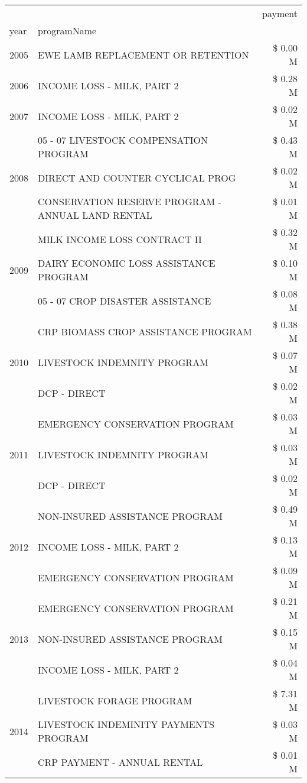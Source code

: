 \begin{tabular}{llr}
\toprule
 &  & payment \\
year & programName &  \\
\midrule
2005 & EWE LAMB REPLACEMENT OR RETENTION & \$ 0.00 M \\
\cline{1-3}
2006 & INCOME LOSS - MILK, PART 2 & \$ 0.28 M \\
\cline{1-3}
2007 & INCOME LOSS - MILK, PART 2 & \$ 0.02 M \\
\cline{1-3}
\multirow[t]{3}{*}{2008} & 05 - 07 LIVESTOCK COMPENSATION PROGRAM & \$ 0.43 M \\
 & DIRECT AND COUNTER CYCLICAL PROG & \$ 0.02 M \\
 & CONSERVATION RESERVE PROGRAM - ANNUAL LAND RENTAL & \$ 0.01 M \\
\cline{1-3}
\multirow[t]{3}{*}{2009} & MILK INCOME LOSS CONTRACT II & \$ 0.32 M \\
 & DAIRY ECONOMIC LOSS ASSISTANCE PROGRAM & \$ 0.10 M \\
 & 05 - 07 CROP DISASTER ASSISTANCE & \$ 0.08 M \\
\cline{1-3}
\multirow[t]{3}{*}{2010} & CRP BIOMASS CROP ASSISTANCE PROGRAM & \$ 0.38 M \\
 & LIVESTOCK INDEMNITY PROGRAM & \$ 0.07 M \\
 & DCP - DIRECT & \$ 0.02 M \\
\cline{1-3}
\multirow[t]{3}{*}{2011} & EMERGENCY CONSERVATION PROGRAM & \$ 0.03 M \\
 & LIVESTOCK INDEMNITY PROGRAM & \$ 0.03 M \\
 & DCP - DIRECT & \$ 0.02 M \\
\cline{1-3}
\multirow[t]{3}{*}{2012} & NON-INSURED ASSISTANCE PROGRAM & \$ 0.49 M \\
 & INCOME LOSS - MILK, PART 2 & \$ 0.13 M \\
 & EMERGENCY CONSERVATION PROGRAM & \$ 0.09 M \\
\cline{1-3}
\multirow[t]{3}{*}{2013} & EMERGENCY CONSERVATION PROGRAM & \$ 0.21 M \\
 & NON-INSURED ASSISTANCE PROGRAM & \$ 0.15 M \\
 & INCOME LOSS - MILK, PART 2 & \$ 0.04 M \\
\cline{1-3}
\multirow[t]{3}{*}{2014} & LIVESTOCK FORAGE PROGRAM & \$ 7.31 M \\
 & LIVESTOCK INDEMINITY PAYMENTS PROGRAM & \$ 0.03 M \\
 & CRP PAYMENT - ANNUAL RENTAL & \$ 0.01 M \\

\end{tabular}
